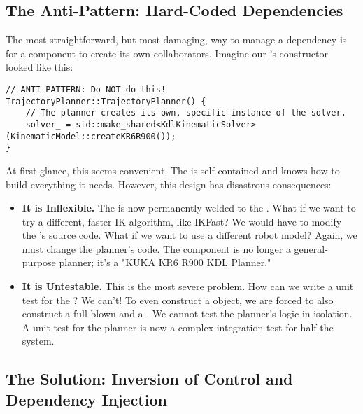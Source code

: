 \subsection{The Anti-Pattern: Hard-Coded Dependencies}
\label{subsec:hard_coded_dependencies}

The most straightforward, but most damaging, way to manage a dependency is for a component to create its own collaborators. Imagine our 's constructor looked like this:

\begin{verbatim}
// ANTI-PATTERN: Do NOT do this!
TrajectoryPlanner::TrajectoryPlanner() {
    // The planner creates its own, specific instance of the solver.
    solver_ = std::make_shared<KdlKinematicSolver>(KinematicModel::createKR6R900());
}
\end{verbatim}
\label{lst:hard-coded-dependency}


At first glance, this seems convenient. The  is self-contained and knows how to build everything it needs. However, this design has disastrous consequences:
\begin{itemize}
    \item \textbf{It is Inflexible.} The  is now permanently welded to the . What if we want to try a different, faster IK algorithm, like IKFast? We would have to modify the 's source code. What if we want to use a different robot model? Again, we must change the planner's code. The component is no longer a general-purpose planner; it's a "KUKA KR6 R900 KDL Planner."
    \item \textbf{It is Untestable.} This is the most severe problem. How can we write a unit test for the ? We can't! To even construct a  object, we are forced to also construct a full-blown  and a . We cannot test the planner's logic in isolation. A unit test for the planner is now a complex integration test for half the system.
\end{itemize}

\subsection{The Solution: Inversion of Control and Dependency Injection}
\label{subsec:inversion_of_control}

